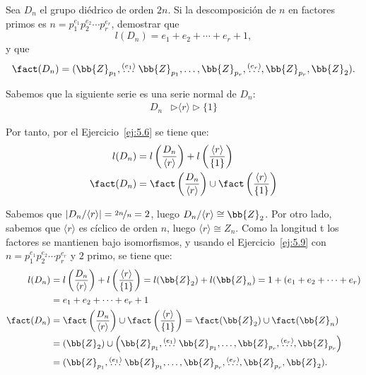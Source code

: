 \begin{ejercicio}
    Sea $D_n$ el grupo diédrico de orden $2n$. Si la descomposición de $n$ en factores primos es $n = p_1^{e_1} p_2^{e_2} \cdots p_r^{e_r}$, demostrar que
    \[
        l(D_n) = e_1 + e_2 + \cdots + e_r + 1,
    \]
    y que
    \[
        \fact(D_n) = (\bb{Z}_{p_1}, \stackrel{(e_1)}{\ldots}\bb{Z}_{p_1}, \dots, \bb{Z}_{p_r},\stackrel{(e_r)}{\ldots}, \bb{Z}_{p_r}, \bb{Z}_2).
    \]

    Sabemos que la siguiente serie es una serie normal de $D_n$:
    \begin{align*}
        D_n &\rhd \langle r \rangle \rhd \{1\}
    \end{align*}

    Por tanto, por el Ejercicio~\ref{ej:5.6} se tiene que:
    \begin{align*}
        l(D_n) &= l\left(\dfrac{D_n}{\langle r \rangle}\right) + l\left(\dfrac{\langle r \rangle}{\{1\}}\right) \\
        \fact(D_n) &= \fact\left(\dfrac{D_n}{\langle r \rangle}\right) \cup \fact\left(\dfrac{\langle r \rangle}{\{1\}}\right)
    \end{align*}

    Sabemos que $|D_n/\langle r \rangle|=\nicefrac{2n}{n}=2$, luego $D_n/\langle r \rangle \cong \bb{Z}_2$. Por otro lado, sabemos que $\langle r \rangle$ es cíclico de orden $n$, luego $\langle r \rangle \cong Z_n$. Como la longitud t los factores se mantienen bajo isomorfismos, y usando el Ejercicio~\ref{ej:5.9} con $n = p_1^{e_1} p_2^{e_2} \cdots p_r^{e_r}$ y $2$ primo, se tiene que:
    \begin{align*}
        l(D_n) &= l\left(\dfrac{D_n}{\langle r \rangle}\right) + l\left(\dfrac{\langle r \rangle}{\{1\}}\right) 
        = l(\bb{Z}_2) + l(\bb{Z}_n) 
        = 1 + \left(e_1 + e_2 + \cdots + e_r\right) \\
        &= e_1 + e_2 + \cdots + e_r + 1\\
        \fact(D_n) &= \fact\left(\dfrac{D_n}{\langle r \rangle}\right) \cup \fact\left(\dfrac{\langle r \rangle}{\{1\}}\right)
        = \fact(\bb{Z}_2) \cup \fact(\bb{Z}_n) \\
        &= (\bb{Z}_2) \cup \left(\bb{Z}_{p_1}, \stackrel{(e_1)}{\ldots}\bb{Z}_{p_1}, \dots, \bb{Z}_{p_r},\stackrel{(e_r)}{\ldots}, \bb{Z}_{p_r}\right)\\
        &= (\bb{Z}_{p_1}, \stackrel{(e_1)}{\ldots}\bb{Z}_{p_1}, \dots, \bb{Z}_{p_r},\stackrel{(e_r)}{\ldots}, \bb{Z}_{p_r}, \bb{Z}_2).
    \end{align*}
\end{ejercicio}

